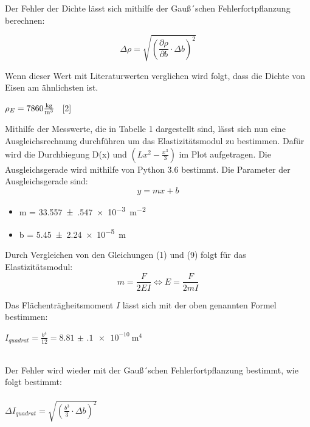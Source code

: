 Der Fehler der Dichte lässt sich mithilfe der Gauß´schen Fehlerfortpflanzung berechnen:

\begin{equation}
  \Delta \rho = \sqrt{\left(\frac{\partial\rho}{\partial b} \cdot \Delta b \right)^2}
\end{equation}

Wenn dieser Wert mit Literaturwerten verglichen wird folgt, dass die Dichte von Eisen
am ähnlichsten ist.\\
\centerline{$\rho_{E} = 7860 \si[per-mode=fraction]{\kilo\gram\per\metre\tothe{3}}$ \, [2]}


Mithilfe der Messwerte, die in Tabelle 1 dargestellt sind, lässt sich nun eine
Ausgleichsrechnung durchführen um das Elastizitätsmodul zu bestimmen. Dafür wird die
Durchbiegung D(x) und $\left( Lx^2- \frac{x^3}{3} \right)$ im Plot aufgetragen.
Die Ausgleichsgerade wird mithilfe von Python 3.6 bestimmt.
Die Parameter der Ausgleichsgerade sind:\\

\begin{equation}
  y=mx+b
\end{equation}

\begin{itemize}
  \item m = \SI{33.557(547)e-3}{\meter\tothe{-2}}
  \item b = \SI{5.45(224)e-5}{\meter}
\end{itemize}

Durch Vergleichen von den Gleichungen (1) und (9) folgt für das Elastizitätsmodul:\\

\begin{equation}
  m = \frac{F}{2EI} \iff E= \frac{F}{2mI}
\end{equation}

Das Flächenträgheitsmoment $I$ lässt sich mit der oben genannten Formel bestimmen:\\

\centerline{$I_{quadrat} = \frac{b^4}{12} = \SI{8.81(10)e-10}{\meter\tothe{4}}$}\ \\

Der Fehler wird wieder mit der Gauß´schen Fehlerfortpflanzung bestimmt, wie folgt bestimmt:\\\\

$\Delta I_{quadrat} = \sqrt{\left( \frac{b^3}{3} \cdot \Delta b\right)^2}$\\\\

